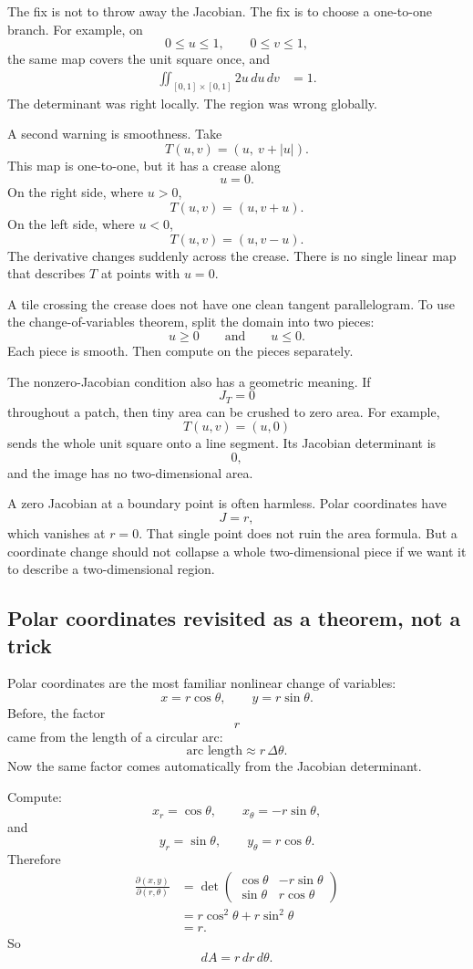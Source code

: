 The fix is not to throw away the Jacobian.  The fix is to choose a one-to-one branch.
For example, on
\[
    0\le u\le1,\qquad 0\le v\le1,
\]
the same map covers the unit square once, and
\[
\begin{aligned}
    \iint_{[0,1]\times[0,1]} 2u\,du\,dv
    &=
    1.
\end{aligned}
\]
The determinant was right locally.  The region was wrong globally.

A second warning is smoothness.  Take
\[
    T(u,v)=(u,\ v+|u|).
\]
This map is one-to-one, but it has a crease along
\[
    u=0.
\]
On the right side, where \(u>0\),
\[
    T(u,v)=(u,v+u).
\]
On the left side, where \(u<0\),
\[
    T(u,v)=(u,v-u).
\]
The derivative changes suddenly across the crease.  There is no single linear map that
describes \(T\) at points with \(u=0\).

A tile crossing the crease does not have one clean tangent parallelogram.  To use the
change-of-variables theorem, split the domain into two pieces:
\[
    u\ge0
    \qquad\text{and}\qquad
    u\le0.
\]
Each piece is smooth.  Then compute on the pieces separately.

The nonzero-Jacobian condition also has a geometric meaning.  If
\[
    J_T=0
\]
throughout a patch, then tiny area can be crushed to zero area.  For example,
\[
    T(u,v)=(u,0)
\]
sends the whole unit square onto a line segment.  Its Jacobian determinant is
\[
    0,
\]
and the image has no two-dimensional area.

A zero Jacobian at a boundary point is often harmless.  Polar coordinates have
\[
    J=r,
\]
which vanishes at \(r=0\).  That single point does not ruin the area formula.  But a
coordinate change should not collapse a whole two-dimensional piece if we want it to
describe a two-dimensional region.

\subsection{Polar coordinates revisited as a theorem, not a trick}

Polar coordinates are the most familiar nonlinear change of variables:
\[
    x=r\cos\theta,
    \qquad
    y=r\sin\theta.
\]
Before, the factor
\[
    r
\]
came from the length of a circular arc:
\[
    \text{arc length}\approx r\,\Delta\theta.
\]
Now the same factor comes automatically from the Jacobian determinant.

Compute:
\[
    x_r=\cos\theta,
    \qquad
    x_\theta=-r\sin\theta,
\]
and
\[
    y_r=\sin\theta,
    \qquad
    y_\theta=r\cos\theta.
\]
Therefore
\[
\begin{aligned}
    \frac{\partial(x,y)}{\partial(r,\theta)}
    &=
    \det
    \begin{pmatrix}
        \cos\theta & -r\sin\theta\\
        \sin\theta & r\cos\theta
    \end{pmatrix}\\
    &=
    r\cos^2\theta+r\sin^2\theta\\
    &=
    r.
\end{aligned}
\]
So
\[
\boxed{
    dA=r\,dr\,d\theta.
}
\]

